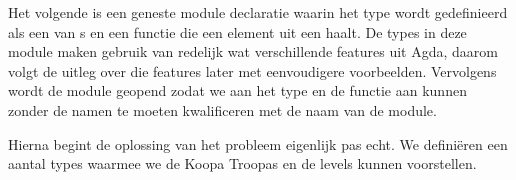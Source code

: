 Het volgende is een geneste module declaratie waarin het type 
wordt gedefinieerd als een  van s en een functie die een
element uit een  haalt. De types in deze module maken gebruik van
redelijk wat verschillende features uit Agda, daarom volgt de uitleg over die
features later met eenvoudigere voorbeelden. Vervolgens wordt de module geopend
zodat we aan het type en de functie aan kunnen zonder de namen te moeten
kwalificeren met de naam van de module.


Hierna begint de oplossing van het probleem eigenlijk pas echt. We definiëren
een aantal types waarmee we de Koopa Troopas en de levels kunnen voorstellen.


